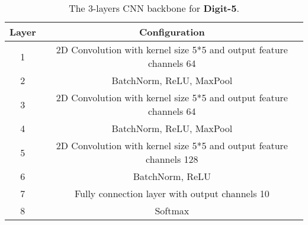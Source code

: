 \documentclass{article}
\begin{document}
\begin{table*}[ht]
\centering
\begin{tabular}{cc}
\hline
\multicolumn{1}{c|}{Layer} & Configuration                                                       \\ \hline
\multicolumn{1}{c|}{1}     & 2D Convolution with kernel size 5*5 and output feature channels 64  \\ \hline
\multicolumn{1}{c|}{2}     & BatchNorm, ReLU, MaxPool                                            \\ \hline
\multicolumn{1}{c|}{3}     & 2D Convolution with kernel size 5*5 and output feature channels 64  \\ \hline
\multicolumn{1}{c|}{4}     & BatchNorm, ReLU, MaxPool                                            \\ \hline
\multicolumn{1}{c|}{5}     & 2D Convolution with kernel size 5*5 and output feature channels 128 \\ \hline
\multicolumn{1}{c|}{6}     & BatchNorm, ReLU                                                     \\ \hline
\multicolumn{1}{c|}{7}     & Fully connection layer with output channels 10                      \\ \hline
\multicolumn{1}{c|}{8}     & Softmax                                                             \\ \hline
\end{tabular}
\caption{The 3-layers CNN backbone for \textbf{Digit-5}.}
\label{table:backbone}
\end{table*}
\end{document}

